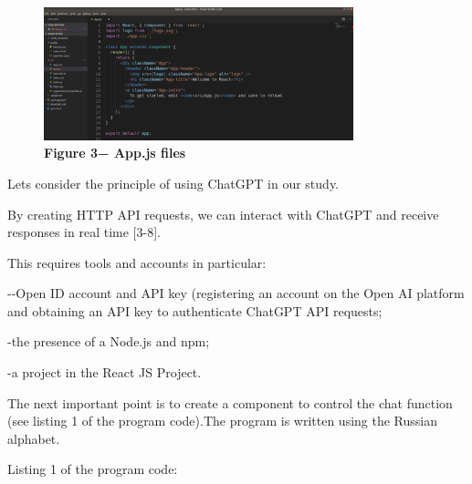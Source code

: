 \begin{figure}[H]
	\centering
	\includegraphics[width=0.8\textwidth]{assets/128}
	\caption*{\bfseries Figure 3− App.js files}
\end{figure}

Let\textquotesingle s consider the principle of using ChatGPT in our
study.

By creating HTTP API requests, we can interact with ChatGPT and receive
responses in real time {[}3-8{]}.

This requires tools and accounts in particular:

-\/-Open ID account and API key (registering an account on the Open AI
platform and obtaining an API key to authenticate ChatGPT API requests;

-the presence of a Node.js and npm;

-a project in the React JS Project.

The next important point is to create a component to control the chat
function (see listing 1 of the program code).The program is written
using the Russian alphabet.

Listing 1 of the program code:

